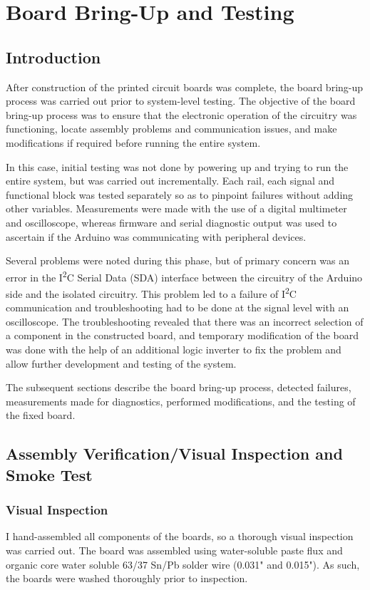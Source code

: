 \chapter{Board Bring-Up and Testing}
\label{ch:board-bringup}

\section{Introduction}

After construction of the printed circuit boards was complete, the board bring-up process was carried out prior to system-level testing.
The objective of the board bring-up process was to ensure that the electronic
operation of the circuitry was functioning, locate assembly problems and communication
issues, and make modifications if required before running the entire system.

In this case, initial testing was not done by powering up and trying to run the
entire system, but was carried out incrementally. Each rail, each signal and
functional block was tested separately so as to pinpoint failures without adding other
variables. Measurements were made with the use of a digital multimeter and
oscilloscope, whereas firmware and serial diagnostic output was used to ascertain if
the Arduino was communicating with peripheral devices.

Several problems were noted during this phase, but of primary concern was an error in
the I\textsuperscript{2}C Serial Data (SDA) interface between the circuitry of the
Arduino side and the isolated circuitry. This problem led to a failure of I\textsuperscript{2}C
communication and troubleshooting had to be done at the signal level with an
oscilloscope. The troubleshooting revealed that there was an incorrect selection of
a component in the constructed board, and temporary modification of the board was done
with the help of an additional logic inverter to fix the problem and allow further
development and testing of the system.

The subsequent sections describe the board bring-up process, detected failures,
measurements made for diagnostics, performed modifications, and the testing of the fixed
board.

\section{Assembly Verification/Visual Inspection and Smoke Test}
\subsection{Visual Inspection}
I hand-assembled all components of the boards, so a thorough visual inspection was carried out. The board was assembled using water-soluble paste flux and organic core water soluble 63/37 Sn/Pb solder wire (0.031" and 0.015"). As such, the boards were washed thoroughly prior to inspection.

